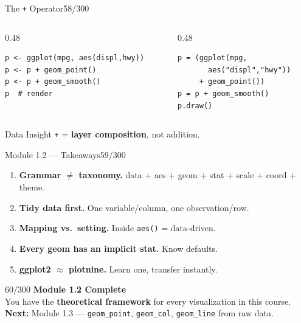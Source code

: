 \documentclass[10pt]{beamer}
\newcommand{\smark}[1]{\hfill{\scriptsize\color{codegray}#1}}
\begin{document}
\begin{frame}[fragile]{The \texttt{+} Operator}\smark{58/300}
\begin{columns}[T]
\begin{column}{0.48\textwidth}
\begin{lstlisting}[style=Rstyle]
p <- ggplot(mpg, aes(displ,hwy))
p <- p + geom_point()
p <- p + geom_smooth()
p  # render
\end{lstlisting}
\end{column}
\begin{column}{0.48\textwidth}
\begin{lstlisting}[style=Pystyle]
p = (ggplot(mpg,
       aes("displ","hwy"))
     + geom_point())
p = p + geom_smooth()
p.draw()
\end{lstlisting}
\end{column}
\end{columns}
\vspace{0.2cm}
\begin{exampleblock}{Data Insight}
    \scriptsize \texttt{+} = \textbf{layer composition}, not addition.
\end{exampleblock}
\end{frame}

\begin{frame}{Module 1.2 --- Takeaways}\smark{59/300}
\begin{enumerate}
    \item \textbf{Grammar $\neq$ taxonomy.} data + aes + geom + stat + scale + coord + theme.
    \item \textbf{Tidy data first.} One variable/column, one observation/row.
    \item \textbf{Mapping vs.\ setting.} Inside \texttt{aes()} = data-driven.
    \item \textbf{Every geom has an implicit stat.} Know defaults.
    \item \textbf{ggplot2 $\approx$ plotnine.} Learn one, transfer instantly.
\end{enumerate}
\end{frame}

\begin{frame}{}\smark{60/300}
\centering\vspace{1.5cm}
{\Large\textbf{Module 1.2 Complete}}\\[0.5cm]
You have the \textbf{theoretical framework} for every visualization in this course.\\[0.5cm]
\textbf{Next:} Module 1.3 --- \texttt{geom\_point}, \texttt{geom\_col}, \texttt{geom\_line} from raw data.
\end{frame}
\end{document}
